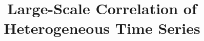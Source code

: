 \documentclass{sig-alternate}
\begin{document}
%

\title{Large-Scale Correlation of Heterogeneous Time Series}


%
%
%
%
%
\end{document}
